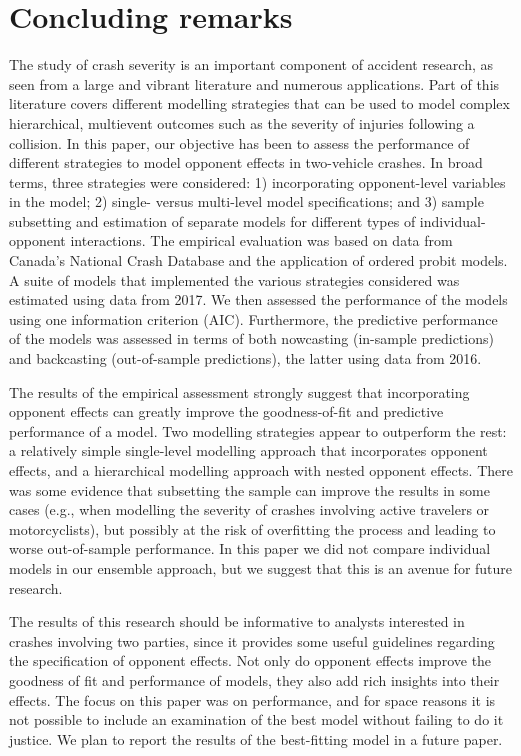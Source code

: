 \documentclass[]{elsarticle} %
\begin{document}
\hypertarget{sec:concluding-remarks}{%
\section{Concluding remarks}\label{sec:concluding-remarks}}

The study of crash severity is an important component of accident
research, as seen from a large and vibrant literature and numerous
applications. Part of this literature covers different modelling
strategies that can be used to model complex hierarchical, multievent
outcomes such as the severity of injuries following a collision. In this
paper, our objective has been to assess the performance of different
strategies to model opponent effects in two-vehicle crashes. In broad
terms, three strategies were considered: 1) incorporating opponent-level
variables in the model; 2) single- versus multi-level model
specifications; and 3) sample subsetting and estimation of separate
models for different types of individual-opponent interactions. The
empirical evaluation was based on data from Canada's National Crash
Database and the application of ordered probit models. A suite of models
that implemented the various strategies considered was estimated using
data from 2017. We then assessed the performance of the models using one
information criterion (AIC). Furthermore, the predictive performance of
the models was assessed in terms of both nowcasting (in-sample
predictions) and backcasting (out-of-sample predictions), the latter
using data from 2016.

The results of the empirical assessment strongly suggest that
incorporating opponent effects can greatly improve the goodness-of-fit
and predictive performance of a model. Two modelling strategies appear
to outperform the rest: a relatively simple single-level modelling
approach that incorporates opponent effects, and a hierarchical
modelling approach with nested opponent effects. There was some evidence
that subsetting the sample can improve the results in some cases (e.g.,
when modelling the severity of crashes involving active travelers or
motorcyclists), but possibly at the risk of overfitting the process and
leading to worse out-of-sample performance. In this paper we did not
compare individual models in our ensemble approach, but we suggest that
this is an avenue for future research.

The results of this research should be informative to analysts
interested in crashes involving two parties, since it provides some
useful guidelines regarding the specification of opponent effects. Not
only do opponent effects improve the goodness of fit and performance of
models, they also add rich insights into their effects. The focus on
this paper was on performance, and for space reasons it is not possible
to include an examination of the best model without failing to do it
justice. We plan to report the results of the best-fitting model in a
future paper.
\end{document}
